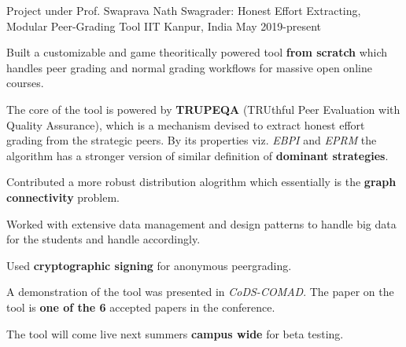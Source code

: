 

\begin{cventries}

  \cventry
    {Project under Prof. Swaprava Nath} %
    {Swagrader: Honest Effort Extracting, Modular Peer-Grading Tool} %
    {IIT Kanpur, India} %
    {May 2019-present} %
    {
      \begin{cvitems} %
        \item {Built a customizable and game theoritically powered tool \textbf{from scratch} which handles peer grading and normal grading workflows for massive open online courses.}
        \item {The core of the tool is powered by \textbf{TRUPEQA} (TRUthful Peer Evaluation with Quality Assurance), which is a mechanism devised to extract honest effort grading from the strategic peers. By its properties viz. \textit{EBPI} and \textit{EPRM} the algorithm has a stronger version of similar definition of \textbf{dominant strategies}.}
        \item {Contributed a more robust distribution alogrithm which essentially is the \textbf{graph connectivity} problem.}
        \item {Worked with extensive data management and design patterns to handle big data for the students and handle accordingly.}
        \item {Used \textbf{cryptographic signing} for anonymous peergrading.}        
        \item {A demonstration of the tool was presented in \textit{CoDS-COMAD}. The paper on the tool is \textbf{one of the 6} accepted papers in the conference.}        
        \item {The tool will come live next summers \textbf{campus wide} for beta testing.}
      \end{cvitems}
    }


\end{cventries}
